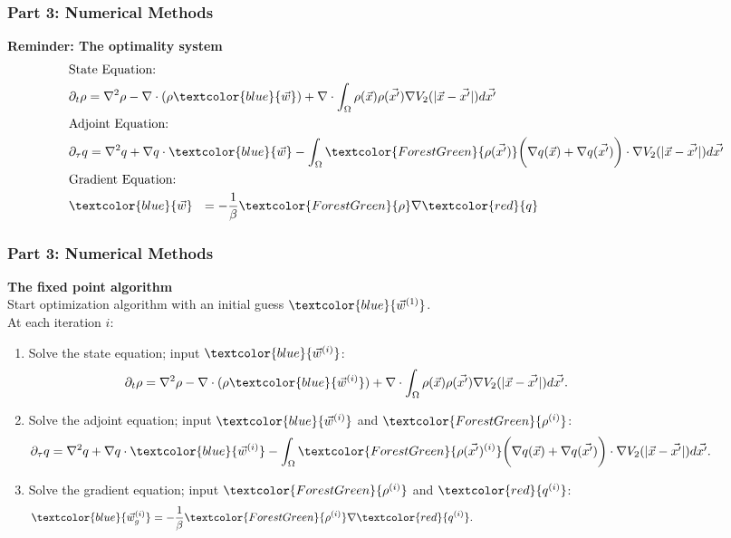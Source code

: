 \documentclass[aspectratio=169,xcolor=dvipsnames]{beamer}
\begin{document}
\begin{frame}
	\frametitle{Part 3: Numerical Methods}
	\textbf{Reminder: The optimality system}
	 \begin{align*}
	 &\text{State Equation:}\\
	 &\partial_t \rho  = \nabla^2 \rho  - \nabla \cdot (\rho \textcolor{blue}{\vec{w}} )
	 + \nabla \cdot \int_\Omega \rho(\vec{x}) \rho(\vec{x'}) \nabla V_2(|\vec{x}-\vec{x'}|)d\vec{x'}  \\
	 &\text{Adjoint Equation:}\\
	 &\partial_{{\tau}} q  = \nabla^2 q  + \nabla q  \cdot \textcolor{blue}{\vec{w}}  
	 - \int_\Omega \textcolor{ForestGreen}{\rho( \vec{x'})} \bigg(\nabla q(\vec{x}) + \nabla q(\vec{x'})\bigg) \cdot \nabla V_2(|\vec{x}-\vec{x'}|)d\vec{x'} \\
	 &\text{Gradient Equation:}\\
	 &\textcolor{blue}{\vec{w}} \ \ = - \frac{1}{\beta}\textcolor{ForestGreen}{\rho} \nabla \textcolor{red}{q} \\
	 \end{align*}
\end{frame}


\begin{frame}
	\frametitle{Part 3: Numerical Methods}
	\vspace{0.5cm}
	\textbf{The fixed point algorithm}\\
	Start optimization algorithm with an initial guess $\textcolor{blue}{\vec{w}^{(1)}}$.\\
	\vspace{0.3cm}
	At each iteration $i$:
	\begin{enumerate}
     \item Solve the state equation; input $\textcolor{blue}{\vec{w}^{(i)}}$:
     \begin{align*}
     \partial_t \rho  = \nabla^2 \rho  - \nabla \cdot (\rho \textcolor{blue}{\vec{w}^{(i)}} )
     + \nabla \cdot \int_\Omega \rho(\vec{x}) \rho(\vec{x'}) \nabla V_2(|\vec{x}-\vec{x'}|)d\vec{x'}. \phantom{abcdefghijklmnopqrs}
     \end{align*}
     \item Solve the adjoint equation; input $\textcolor{blue}{\vec{w}^{(i)}}$ and $\textcolor{ForestGreen}{{\rho}^{(i)}}$:
     \begin{align*}
     \partial_{{\tau}} q  = \nabla^2 q  + \nabla q  \cdot \textcolor{blue}{\vec{w}^{(i)}}  
     - \int_\Omega \textcolor{ForestGreen}{\rho( \vec{x'})^{(i)}} \bigg(\nabla q( \vec{x} ) + \nabla q( \vec{x'})\bigg) \cdot \nabla V_2(|\vec{x}-\vec{x'}|)d\vec{x'}. \phantom{abcdefghijklm}
     \end{align*}
     \item Solve the gradient equation; input $\textcolor{ForestGreen}{{\rho}^{(i)}}$ and $\textcolor{red}{{q}^{(i)}}$:
     \begin{align*}
     \textcolor{blue}{\vec{w}^{(i)}_g} = - \frac{1}{\beta}\textcolor{ForestGreen}{{\rho}^{(i)}} \nabla \textcolor{red}{{q}^{(i)}}. \phantom{abcdefghijklmnopqr   ykabtw    btkspa abcdefghijklmnopqr   ykabtw    btksp}
     \end{align*}
	\end{enumerate}	
\end{frame}
\end{document}
